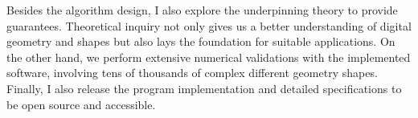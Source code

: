 Besides the algorithm design, I also explore the underpinning theory to provide guarantees. Theoretical inquiry not only gives us a better understanding of digital geometry and shapes but also lays the foundation for suitable applications. On the other hand, we perform extensive numerical validations with the implemented software, involving tens of thousands of complex different geometry shapes. Finally, I also release the program implementation and detailed specifications to be open source and accessible.
